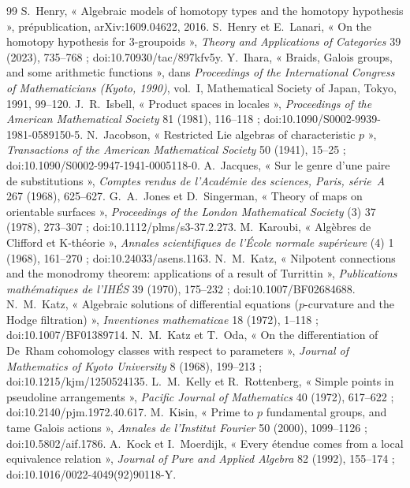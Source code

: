 \documentclass[11pt]{article}
\theoremstyle{plain}
\theoremstyle{definition}
\theoremstyle{plain}
\theoremstyle{definition}
\theoremstyle{remark}
\renewcommand{\_}{\bkunderscore\allowbreak}
\begin{document}
\begin{thebibliography}{99}
 S.~Henry, « Algebraic models of homotopy types and the homotopy hypothesis », prépublication, arXiv:1609.04622, 2016.
 S.~Henry et E.~Lanari, « On the homotopy hypothesis for 3-groupoids », \emph{Theory and Applications of Categories} 39 (2023), 735--768 ; doi:10.70930/tac/897kfv5y.
 Y.~Ihara, « Braids, Galois groups, and some arithmetic functions », dans \emph{Proceedings of the International Congress of Mathematicians (Kyoto, 1990)}, vol.~I, Mathematical Society of Japan, Tokyo, 1991, 99--120.
 J.~R.~Isbell, « Product spaces in locales », \emph{Proceedings of the American Mathematical Society} 81 (1981), 116--118 ; doi:10.1090/S0002-9939-1981-0589150-5.
 N.~Jacobson, « Restricted Lie algebras of characteristic $p$ », \emph{Transactions of the American Mathematical Society} 50 (1941), 15--25 ; doi:10.1090/S0002-9947-1941-0005118-0.
 A.~Jacques, « Sur le genre d'une paire de substitutions », \emph{Comptes rendus de l'Académie des sciences, Paris, série~A} 267 (1968), 625--627.
 G.~A.~Jones et D.~Singerman, « Theory of maps on orientable surfaces », \emph{Proceedings of the London Mathematical Society} (3) 37 (1978), 273--307 ; doi:10.1112/plms/s3-37.2.273.
 M.~Karoubi, « Algèbres de Clifford et K-théorie », \emph{Annales scientifiques de l'École normale supérieure} (4) 1 (1968), 161--270 ; doi:10.24033/asens.1163.
 N.~M.~Katz, « Nilpotent connections and the monodromy theorem: applications of a result of Turrittin », \emph{Publications mathématiques de l'IHÉS} 39 (1970), 175--232 ; doi:10.1007/BF02684688.
 N.~M.~Katz, « Algebraic solutions of differential equations ($p$-curvature and the Hodge filtration) », \emph{Inventiones mathematicae} 18 (1972), 1--118 ; doi:10.1007/BF01389714.
 N.~M.~Katz et T.~Oda, « On the differentiation of De~Rham cohomology classes with respect to parameters », \emph{Journal of Mathematics of Kyoto University} 8 (1968), 199--213 ; doi:10.1215/kjm/1250524135.
 L.~M.~Kelly et R.~Rottenberg, « Simple points in pseudoline arrangements », \emph{Pacific Journal of Mathematics} 40 (1972), 617--622 ; doi:10.2140/pjm.1972.40.617.
 M.~Kisin, « Prime to $p$ fundamental groups, and tame Galois actions », \emph{Annales de l'Institut Fourier} 50 (2000), 1099--1126 ; doi:10.5802/aif.1786.
 A.~Kock et I.~Moerdijk, « Every étendue comes from a local equivalence relation », \emph{Journal of Pure and Applied Algebra} 82 (1992), 155--174 ; doi:10.1016/0022-4049(92)90118-Y.

\end{thebibliography}
\end{document}
